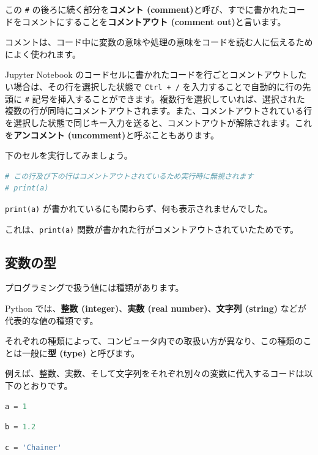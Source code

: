 この \texttt{\#} の後ろに続く部分を\textbf{コメント (comment)}と呼び、すでに書かれたコードをコメントにすることを\textbf{コメントアウト (comment out)}と言います。

コメントは、コード中に変数の意味や処理の意味をコードを読む人に伝えるためによく使われます。


Jupyter Notebook のコードセルに書かれたコードを行ごとコメントアウトしたい場合は、その行を選択した状態で \texttt{Ctrl + /} を入力することで自動的に行の先頭に \texttt{\#} 記号を挿入することができます。複数行を選択していれば、選択された複数の行が同時にコメントアウトされます。また、コメントアウトされている行を選択した状態で同じキー入力を送ると、コメントアウトが解除されます。これを\textbf{アンコメント (uncomment)}と呼ぶこともあります。


下のセルを実行してみましょう。


\begin{lstlisting}[style=codecell,language=Python]
# この行及び下の行はコメントアウトされているため実行時に無視されます
# print(a)
\end{lstlisting}

\texttt{print(a)} が書かれているにも関わらず、何も表示されませんでした。

これは、\texttt{print(a)} 関数が書かれた行がコメントアウトされていたためです。


\subsection{変数の型}


プログラミングで扱う値には種類があります。

Python では、\textbf{整数 (integer)}、\textbf{実数 (real number)}、\textbf{文字列 (string)} などが代表的な値の種類です。

それぞれの種類によって、コンピュータ内での取扱い方が異なり、この種類のことは一般に\textbf{型 (type)} と呼びます。


例えば、整数、実数、そして文字列をそれぞれ別々の変数に代入するコードは以下のとおりです。


\begin{lstlisting}[style=codecell,language=Python]
a = 1
\end{lstlisting}

\begin{lstlisting}[style=codecell,language=Python]
b = 1.2
\end{lstlisting}

\begin{lstlisting}[style=codecell,language=Python]
c = 'Chainer'
\end{lstlisting}

